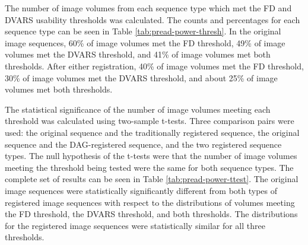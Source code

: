 The number of image volumes from each sequence type which met the FD and DVARS usability thresholds was calculated. The counts and percentages for each sequence type can be seen in Table \ref{tab:pread-power-thresh}. In the original image sequences, 60\% of image volumes met the FD threshold, 49\% of image volumes met the DVARS threshold, and 41\% of image volumes met both thresholds. After either registration, 40\% of image volumes met the FD threshold, 30\% of image volumes met the DVARS threshold, and about 25\% of image volumes met both thresholds.

The statistical significance of the number of image volumes meeting each threshold was calculated using two-sample t-tests. Three comparison pairs were used: the original sequence and the traditionally registered sequence, the original sequence and the DAG-registered sequence, and the two registered sequence types. The null hypothesis of the t-tests were that the number of image volumes meeting the threshold being tested were the same for both sequence types. The complete set of results can be seen in Table \ref{tab:pread-power-ttest}. The original image sequences were statistically significantly different from both types of registered image sequences with respect to the distributions of volumes meeting the FD threshold, the DVARS threshold, and both thresholds. The distributions for the registered image sequences were statistically similar for all three thresholds. 


